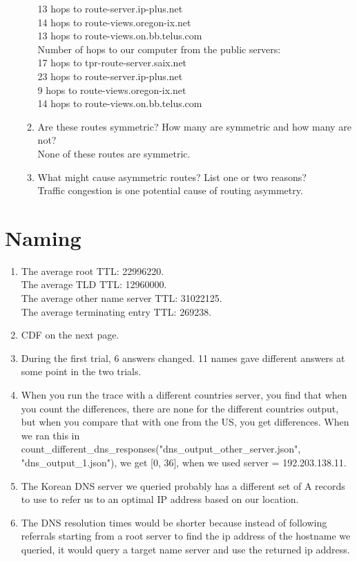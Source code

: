 \documentclass{article}
\begin{document}
\begin{enumerate}
\begin{enumerate}
    13 hops to route-server.ip-plus.net\\
    14 hops to route-views.oregon-ix.net\\
    13 hops to route-views.on.bb.telus.com\\
    Number of hops to our computer from the public servers:\\
    17 hops to tpr-route-server.saix.net\\
    23 hops to route-server.ip-plus.net\\
    9 hops to route-views.oregon-ix.net\\
    14 hops to route-views.on.bb.telus.com
    \item Are these routes symmetric? How many are symmetric and how many are not?\\
    None of these routes are symmetric.
    \item What might cause asymmetric routes? List one or two reasons? \\
    Traffic congestion is one potential cause of routing asymmetry.
    \end{enumerate}
\end{enumerate}
\section{Naming}
    \begin{enumerate}
        \item
        The average root TTL: 22996220.\\
        The average TLD TTL: 12960000.\\
        The average other name server TTL: 31022125.\\
        The average terminating entry TTL: 269238.
        \item
        CDF on the next page. 
        

        \item
        During the first trial, 6 answers changed. 11 names gave different answers at some point in the two trials.
        \item
        When you run the trace with a different countries server, you find that when you count the differences, there are none for the different countries output, but when you compare that with one from the US, you get differences. When we ran this in count\_different\_dns\_responses("dns\_output\_other\_server.json", "dns\_output\_1.json"), we get [0, 36], when we used server = 192.203.138.11. 
        \item
        The Korean DNS server we queried probably has a different set of A records to use to refer us to an optimal IP address based on our location. 
        \item
        The DNS resolution times would be shorter because instead of following referrals starting from a root server to find the ip address of the hostname we queried, it would query a target name server and use the returned ip address.
    \end{enumerate}
\end{document}
